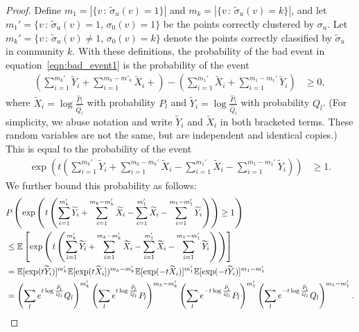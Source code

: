 \documentclass{article}
\begin{document}
\begin{proof}
Define $m_1 = |\{ v \,:\, \tilde \sigma_u(v) = 1 \}|$ and $m_k = | \{ v \,:\, \tilde \sigma_u(v) = k \}|$, and let $m_1' = \{ v \,:\, \tilde \sigma_u(v) = 1 ,\, \sigma_0(v) = 1\}$ be the points correctly clustered by $\sigma_u$. Let $m_k' = \{ v \,:\, \tilde \sigma_u(v) \neq  1,\, \sigma_0(v) = k \}$ denote the points correctly classified by $\tilde \sigma_u$ in community $k$. With these definitions, the probability of the bad event in equation~\eqref{eqn:bad_event1} is the probability of the event
\begin{align*}
\left( \sum_{i=1}^{m_k'} \tilde{Y}_i + \sum_{i=1}^{m_k - m'_k} \tilde{X}_i + \right) - 
\left( \sum_{i=1}^{m_1'} \tilde{X}_i + \sum_{i=1}^{m_1 - m_1'} \tilde{Y}_i  \right) &\geq 0,
\end{align*}
where $\tilde{X}_i = \log \frac{\hat{P}_l}{\hat{Q}_l}$ with probability $P_l$ and $\tilde{Y}_i = \log \frac{\hat{P}_l}{\hat{Q}_l}$ with probability $Q_l$. (For simplicity, we abuse notation and write $\tilde Y_i$ and $\tilde X_i$ in both bracketed terms. These random variables are not the same, but are independent and identical copies.) This is equal to the probability of the event
\begin{align*}
\exp \left( t \left( \sum_{i=1}^{m_k'} \tilde{Y}_i + \sum_{i=1}^{m_k - m_k'} \tilde{X}_i - 
     \sum_{i=1}^{m_1'}  \tilde{X}_i - \sum_{i=1}^{m_1 - m_1'} \tilde{Y}_i  \right) \right) &\geq 1.
\end{align*}
We further bound this probability as follows:
\begin{align*}
& P \left( \exp \left( t \left( \sum_{i=1}^{m_k'} \tilde{Y}_i + \sum_{i=1}^{m_k - m_k'} \tilde{X}_i- 
     \sum_{i=1}^{m_1'}  \tilde{X}_i - \sum_{i=1}^{m_1 - m_1'} \tilde{Y}_i  \right) \right) \geq 1 \right) \\ 
&\leq \E \left[ 
\exp\left( t \left( \sum_{i=1}^{m_k'} \tilde{Y}_i + \sum_{i=1}^{m_k - m_k'} \tilde{X}_i - 
     \sum_{i=1}^{m_1'}  \tilde{X}_i - \sum_{i=1}^{m_1 - m_1'} \tilde{Y}_i  \right) \right)
 \right] \\ 
&=  \E[\exp( t \tilde{Y}_i) ]^{m_k'} 
     \E[ \exp(t \tilde{X}_i ]) ^{m_k - m_k'}  
    \E[ \exp( - t \tilde{X}_i)] ^{m_1'} 
    \E[ \exp( -t \tilde{Y}_i )] ^{m_1 - m_1'} \\
&= \left( \sum_l e^{t \log \frac{\hat{P}_l}{\hat{Q}_l} } Q_l \right)^{m_k'}  
      \left( \sum_l e^{t \log \frac{\hat{P}_l}{\hat{Q}_l}} P_l \right)^{m_k - m_k'} 
      \left( \sum_l e^{- t \log \frac{\hat{P}_l}{\hat{Q_l}} } P_l \right)^{m_1'}
     \left( \sum_l e^{-t \log \frac{\hat{P}_l}{\hat{Q}_l}} Q_l \right)^{m_1 - m_1'}.

\end{align*}
\end{proof}
\end{document}
